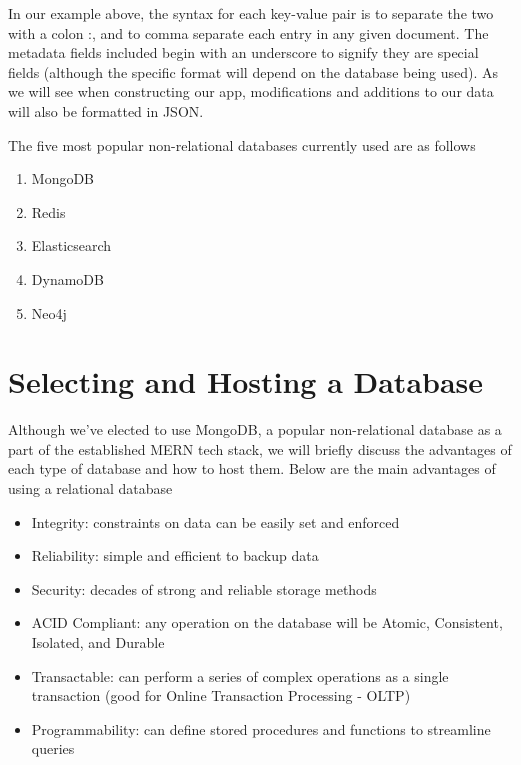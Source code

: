In our example above, the syntax for each key-value pair is to separate the two with a colon :, and to comma separate each entry in any given document. The metadata fields included begin with an underscore to signify they are special fields (although the specific format will depend on the database being used). As we will see when constructing our app, modifications and additions to our data will also be formatted in JSON.

The five most popular non-relational databases currently used are as follows

\begin{enumerate}
    \item MongoDB
    \item Redis 
    \item Elasticsearch
    \item DynamoDB
    \item Neo4j
\end{enumerate}

\section{Selecting and Hosting a Database}

Although we've elected to use MongoDB, a popular non-relational database as a part of the established MERN tech stack, we will briefly discuss the advantages of each type of database and how to host them. Below are the main advantages of using a relational database

\begin{itemize}
    \item Integrity: constraints on data can be easily set and enforced
    \item Reliability: simple and efficient to backup data
    \item Security: decades of strong and reliable storage methods
    \item ACID Compliant: any operation on the database will be Atomic, Consistent, Isolated, and Durable
    \item Transactable: can perform a series of complex operations as a single transaction (good for Online Transaction Processing  - OLTP)
    \item Programmability: can define stored procedures and functions to streamline queries 
\end{itemize}

